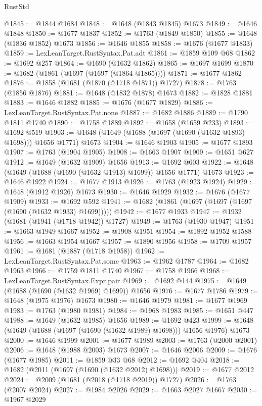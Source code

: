 \begin{lexlean}{RustStd}
\begin{coremodule}
@1845 := @1844 @1684
@1848 := @1648 (@1843 @1845) @1673
@1849 := @1646 @1848
@1850 := @1677 @1837
@1852 := @1763 (@1849 @1850)
@1855 := @1648 (@1836 @1852) @1673
@1856 := @1646 @1855
@1858 := @1676 (@1677 @1833)
@1859 := LexLeanTarget.RustSyntax.Pat.adt
@1861 := @1859 @109 @68
@1862 := @1692 @257
@1864 := @1690 (@1632 @1862)
@1865 := @1697 @1699
@1870 := @1682 (@1861 (@1697 (@1697 (@1864 @1865))))
@1871 := @1677 @1862
@1876 := @1858 (@1681 (@1870 (@1718 @1871)) @1727)
@1878 := @1763 (@1856 @1876)
@1881 := @1648 (@1832 @1878) @1673
@1882 := @1828 @1881
@1883 := @1646 @1882
@1885 := @1676 (@1677 @1829)
@1886 := LexLeanTarget.RustSyntax.Pat.none
@1887 := @1682 @1886
@1889 := @1790 @1811 @1740
@1890 := @1758 @1889
@1892 := @1658 (@1659 @233)
@1893 := @1692 @519
@1903 := @1648 (@1649 (@1688 (@1697 (@1690 (@1632 @1893) @1698))) @1656 @1771) @1673
@1904 := @1646 @1903
@1905 := @1677 @1893
@1907 := @1763 (@1904 @1905)
@1908 := @1663 @1907
@1909 := @1651 @627
@1912 := @1649 (@1632 @1909) @1656
@1913 := @1692 @603
@1922 := @1648 (@1649 (@1688 (@1690 (@1632 @1913) @1699)) @1656 @1771) @1673
@1923 := @1646 @1922
@1924 := @1677 @1913
@1926 := @1763 (@1923 @1924)
@1929 := @1648 (@1912 @1926) @1673
@1930 := @1646 @1929
@1932 := @1676 (@1677 @1909)
@1933 := @1692 @592
@1941 := @1682 (@1861 (@1697 (@1697 (@1697 (@1690 (@1632 @1933) @1699)))))
@1942 := @1677 @1933
@1947 := @1932 (@1681 (@1941 (@1718 @1942)) @1727)
@1949 := @1763 (@1930 @1947)
@1951 := @1663 @1949 @1667
@1952 := @1908 @1951
@1954 := @1892 @1952 @1588
@1956 := @1663 @1954 @1667
@1957 := @1890 @1956
@1958 := @1709 @1957
@1961 := @1681 (@1887 (@1718 @1958))
@1962 := LexLeanTarget.RustSyntax.Pat.some
@1963 := @1962 @1787
@1964 := @1682 @1963
@1966 := @1759 @1811 @1740
@1967 := @1758 @1966
@1968 := LexLeanTarget.RustSyntax.Expr.pair
@1969 := @1692 @144
@1975 := @1649 (@1688 (@1690 (@1632 @1969) @1699)) @1656
@1976 := @1677 @1786
@1979 := @1648 (@1975 @1976) @1673
@1980 := @1646 @1979
@1981 := @1677 @1969
@1983 := @1763 (@1980 @1981)
@1984 := @1968 @1983
@1985 := @1651 @447
@1988 := @1649 (@1632 @1985) @1656
@1989 := @1692 @423
@1999 := @1648 (@1649 (@1688 (@1697 (@1690 (@1632 @1989) @1698))) @1656 @1976) @1673
@2000 := @1646 @1999
@2001 := @1677 @1989
@2003 := @1763 (@2000 @2001)
@2006 := @1648 (@1988 @2003) @1673
@2007 := @1646 @2006
@2009 := @1676 (@1677 @1985)
@2011 := @1859 @33 @68
@2012 := @1692 @404
@2018 := @1682 (@2011 (@1697 (@1690 (@1632 @2012) @1698)))
@2019 := @1677 @2012
@2024 := @2009 (@1681 (@2018 (@1718 @2019)) @1727)
@2026 := @1763 (@2007 @2024)
@2027 := @1984 @2026
@2029 := @1663 @2027 @1667
@2030 := @1967 @2029

\end{coremodule}
\end{lexlean}
